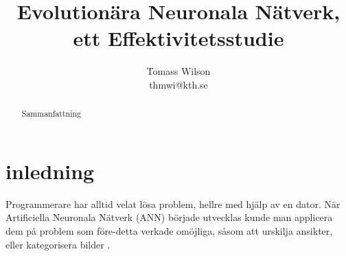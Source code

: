 \documentclass[a4paper, 11pt, twocolumn]{report}
\title{Evolutionära Neuronala Nätverk, ett Effektivitetsstudie}
\author{Tomass Wilson\\thmwi@kth.se}
\begin{document}
  \maketitle

  \begin{abstract}
    Sammanfattning
  \end{abstract}

  \tableofcontents

  \section{inledning}
    Programmerare har alltid velat lösa problem, hellre med hjälp av en dator. När Artificiella Neuronala Nätverk (ANN) började utvecklas kunde man applicera dem på problem som före-detta verkade omöjliga, såsom att urskilja ansikter, eller kategorisera bilder \cite{hopfield1988artificial}. 

\printbibliography
\end{document}
